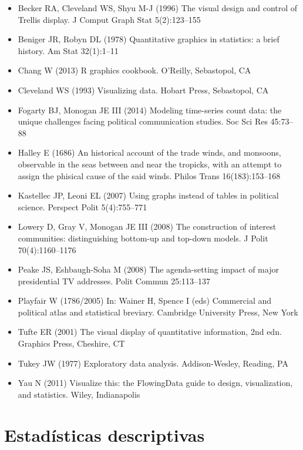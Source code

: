 \documentclass[
]{book}
\providecommand{\tightlist}{%
  \setlength{\itemsep}{0pt}\setlength{\parskip}{0pt}}
\begin{document}
\begin{itemize}
\tightlist
\item
  Becker RA, Cleveland WS, Shyu M-J (1996) The visual design and control of Trellis display. J Comput Graph Stat 5(2):123--155
\item
  Beniger JR, Robyn DL (1978) Quantitative graphics in statistics: a brief history. Am Stat 32(1):1--11
\item
  Chang W (2013) R graphics cookbook. O'Reilly, Sebastopol, CA
\item
  Cleveland WS (1993) Visualizing data. Hobart Press, Sebastopol, CA
\item
  Fogarty BJ, Monogan JE III (2014) Modeling time-series count data: the unique challenges facing political communication studies. Soc Sci Res 45:73--88
\item
  Halley E (1686) An historical account of the trade winds, and monsoons, observable in the seas between and near the tropicks, with an attempt to assign the phisical cause of the said winds. Philos Trans 16(183):153--168
\item
  Kastellec JP, Leoni EL (2007) Using graphs instead of tables in political science. Perspect Polit 5(4):755--771
\item
  Lowery D, Gray V, Monogan JE III (2008) The construction of interest communities: distinguishing bottom-up and top-down models. J Polit 70(4):1160--1176
\item
  Peake JS, Eshbaugh-Soha M (2008) The agenda-setting impact of major presidential TV addresses. Polit Commun 25:113--137
\item
  Playfair W (1786/2005) In: Wainer H, Spence I (eds) Commercial and political atlas and statistical breviary. Cambridge University Press, New York
\item
  Tufte ER (2001) The visual display of quantitative information, 2nd edn. Graphics Press, Cheshire, CT
\item
  Tukey JW (1977) Exploratory data analysis. Addison-Wesley, Reading, PA
\item
  Yau N (2011) Visualize this: the FlowingData guide to design, visualization, and statistics. Wiley, Indianapolis
\end{itemize}

\hypertarget{Estaduxedsticasdescriptivas}{%
\chapter{Estadísticas descriptivas}\label{Estaduxedsticasdescriptivas}}
\end{document}

